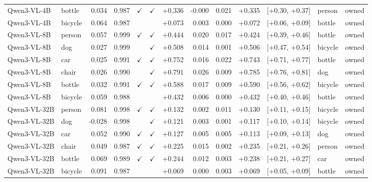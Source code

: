 \begin{longtable}{llrrccrrrrrll}
\rowcolor{cfSlate2}Qwen3-VL-4B & bottle & 0.034 & 0.987 & $\checkmark$ & $\checkmark$ & +0.336 & -0.000 & 0.021 & +0.335 & [+0.30, +0.37] & person & owned \\
\rowcolor{cfSlate2}Qwen3-VL-4B & bicycle & 0.064 & 0.987 &  &  & +0.073 & 0.003 & 0.000 & +0.072 & [+0.06, +0.09] & bottle & owned \\
\rowcolor{cfSlate2}Qwen3-VL-8B & person & 0.057 & 0.999 & $\checkmark$ & $\checkmark$ & +0.444 & 0.020 & 0.017 & +0.424 & [+0.39, +0.46] & bottle & owned \\
\rowcolor{cfSlate2}Qwen3-VL-8B & dog & 0.027 & 0.999 &  & $\checkmark$ & +0.508 & 0.014 & 0.001 & +0.506 & [+0.47, +0.54] & bicycle & owned \\
\rowcolor{cfSlate2}Qwen3-VL-8B & car & 0.025 & 0.991 & $\checkmark$ & $\checkmark$ & +0.752 & 0.016 & 0.022 & +0.743 & [+0.71, +0.77] & bottle & owned \\
\rowcolor{cfSlate2}Qwen3-VL-8B & chair & 0.026 & 0.990 &  & $\checkmark$ & +0.791 & 0.026 & 0.009 & +0.785 & [+0.76, +0.81] & dog & owned \\
\rowcolor{cfSlate2}Qwen3-VL-8B & bottle & 0.032 & 0.991 & $\checkmark$ & $\checkmark$ & +0.588 & 0.017 & 0.009 & +0.590 & [+0.56, +0.62] & bicycle & owned \\
\rowcolor{cfSlate2}Qwen3-VL-8B & bicycle & 0.059 & 0.988 &  &  & +0.432 & 0.006 & 0.000 & +0.432 & [+0.40, +0.46] & bottle & owned \\
\rowcolor{cfSlate2}Qwen3-VL-32B & person & 0.081 & 0.998 & $\checkmark$ & $\checkmark$ & +0.132 & 0.002 & 0.011 & +0.130 & [+0.11, +0.15] & bicycle & owned \\
\rowcolor{cfSlate2}Qwen3-VL-32B & dog & -0.028 & 0.998 &  & $\checkmark$ & +0.121 & 0.003 & 0.001 & +0.117 & [+0.10, +0.14] & bicycle & owned \\
\rowcolor{cfSlate2}Qwen3-VL-32B & car & 0.052 & 0.990 & $\checkmark$ & $\checkmark$ & +0.127 & 0.005 & 0.005 & +0.113 & [+0.09, +0.13] & dog & owned \\
\rowcolor{cfSlate2}Qwen3-VL-32B & chair & 0.049 & 0.987 & $\checkmark$ & $\checkmark$ & +0.225 & 0.015 & 0.002 & +0.235 & [+0.21, +0.26] & person & owned \\
\rowcolor{cfSlate2}Qwen3-VL-32B & bottle & 0.069 & 0.989 & $\checkmark$ & $\checkmark$ & +0.244 & 0.012 & 0.003 & +0.238 & [+0.21, +0.27] & car & owned \\
\rowcolor{cfSlate2}Qwen3-VL-32B & bicycle & 0.091 & 0.987 &  &  & +0.069 & 0.000 & 0.003 & +0.069 & [+0.05, +0.09] & bottle & owned \\

\end{longtable}
